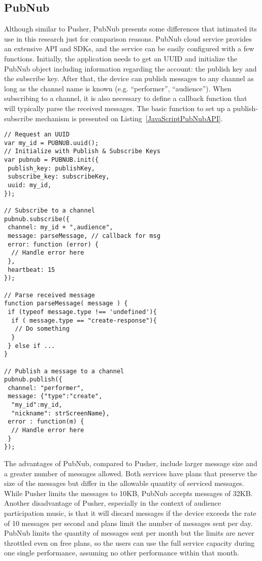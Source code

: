 \subsection*{PubNub}

Although similar to Pusher, PubNub presents some differences that intimated its use in this research just for comparison reasons.
PubNub cloud service provides an extensive API and SDKs, and the service can be easily configured with a few functions.
Initially, the application needs to get an UUID and initialize the PubNub object including information regarding the account: the publish key and the subscribe key.
After that, the device can publish messages to any channel as long as the channel name is known (e.g. ``performer'', ``audience'').
When subscribing to a channel, it is also necessary to define a callback function that will typically parse the received messages.
The basic function to set up a publish-subscribe mechanism is presented on Listing~\ref{JavaScriptPubNubAPI}.

\lstset{language=bash,  caption=Example of JavaScript code from PubNub API presented at audience page, captionpos=b, label=JavaScriptPubNubAPI, numbers=none, numberstyle=\scriptsize}

\begin{lstlisting}[frame=single, float=t]
// Request an UUID
var my_id = PUBNUB.uuid();
// Initialize with Publish & Subscribe Keys
var pubnub = PUBNUB.init({
 publish_key: publishKey,
 subscribe_key: subscribeKey,
 uuid: my_id,
});

// Subscribe to a channel
pubnub.subscribe({
 channel: my_id + ",audience",
 message: parseMessage, // callback for msg
 error: function (error) {
  // Handle error here
 },
 heartbeat: 15
});

// Parse received message
function parseMessage( message ) {
 if (typeof message.type !== 'undefined'){
  if ( message.type == "create-response"){
   // Do something
  }
 } else if ...
}

// Publish a message to a channel
pubnub.publish({
 channel: "performer",
 message: {"type":"create", 
  "my_id":my_id,
  "nickname": strScreenName},
 error : function(m) {
  // Handle error here
 }
});
\end{lstlisting}

The advantages of PubNub, compared to Pusher, include larger message size and a greater number of messages allowed. 
Both services have plans that preserve the size of the messages but differ in the allowable quantity of serviced messages.
While Pusher limits the messages to 10KB, PubNub accepts messages of 32KB.
Another disadvantage of Pusher, especially in the context of audience participation music, is that it will discard messages if the device exceeds the rate of 10 messages per second and plans limit the number of messages sent per day.
PubNub limits the quantity of messages sent per month but the limits are never throttled even on free plans, so the users can use the full service capacity during one single performance, assuming no other performance within that month.

